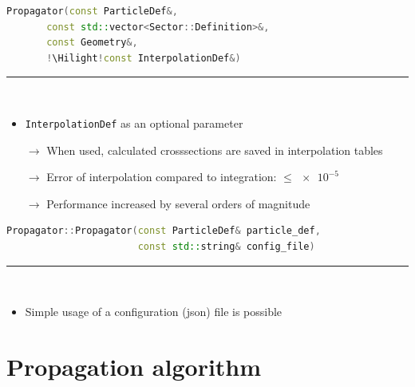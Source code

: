 \documentclass[aspectratio=1610, captions=tableheading, 11pt]{beamer}
\newcommand{\Hilight}{\makebox[0pt][l]{\color{tugreen}\rule[-4pt]{0.65\linewidth}{14pt}}}
\begin{document}
\begin{frame}[fragile]
\begin{lstlisting}[language=C++,basicstyle=\ttfamily,keywordstyle=\color{red}, escapechar=\!]
Propagator(const ParticleDef&,
	   const std::vector<Sector::Definition>&,
	   const Geometry&,
	   !\Hilight!const InterpolationDef&)
\end{lstlisting}
	\textcolor{tugreen}{\rule{\textwidth}{1pt}}\\%
    \begin{itemize}
      \setlength\itemsep{0.5em}
      \item \texttt{InterpolationDef} as an optional parameter
      \item [$\rightarrow$] When used, calculated crosssections are saved in interpolation tables
      \item [$\rightarrow$] Error of interpolation compared to integration: $\leq \num{e-5}$
      \item [$\rightarrow$] Performance increased by several orders of magnitude
    \end{itemize}
\end{frame}

\begin{frame}[fragile]
\begin{lstlisting}[language=C++,basicstyle=\ttfamily,keywordstyle=\color{red}, escapechar=\!]
Propagator::Propagator(const ParticleDef& particle_def, 
                       const std::string& config_file)
\end{lstlisting}
	\textcolor{tugreen}{\rule{\textwidth}{1pt}}\\%
    \begin{itemize}
      \setlength\itemsep{0.5em}
      \item Simple usage of a configuration (json) file is possible
    \end{itemize}
\end{frame}

\section{Propagation algorithm}
\end{document}
